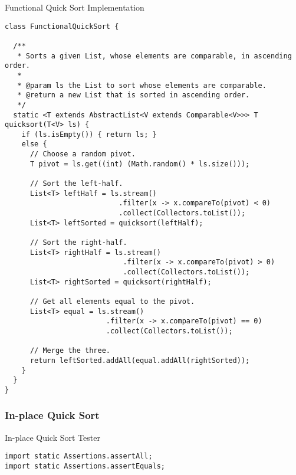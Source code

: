 \begin{cl}{Functional Quick Sort Implementation}
\begin{lstlisting}[language=MyJava]
class FunctionalQuickSort {

  /**
   * Sorts a given List, whose elements are comparable, in ascending order.
   *
   * @param ls the List to sort whose elements are comparable.
   * @return a new List that is sorted in ascending order.
   */
  static <T extends AbstractList<V extends Comparable<V>>> T quicksort(T<V> ls) {
    if (ls.isEmpty()) { return ls; }
    else {
      // Choose a random pivot.
      T pivot = ls.get((int) (Math.random() * ls.size()));
      
      // Sort the left-half.
      List<T> leftHalf = ls.stream()
                           .filter(x -> x.compareTo(pivot) < 0)
                           .collect(Collectors.toList());
      List<T> leftSorted = quicksort(leftHalf); 

      // Sort the right-half.
      List<T> rightHalf = ls.stream()
                            .filter(x -> x.compareTo(pivot) > 0)
                            .collect(Collectors.toList());
      List<T> rightSorted = quicksort(rightHalf);

      // Get all elements equal to the pivot.
      List<T> equal = ls.stream()
                        .filter(x -> x.compareTo(pivot) == 0)
                        .collect(Collectors.toList());

      // Merge the three.
      return leftSorted.addAll(equal.addAll(rightSorted));
    }
  }
}
\end{lstlisting}
\end{cl}
\subsubsection*{In-place Quick Sort}
\begin{cl}{In-place Quick Sort Tester}
\begin{lstlisting}[language=MyJava]
import static Assertions.assertAll;
import static Assertions.assertEquals;

\end{lstlisting}
\end{cl}

